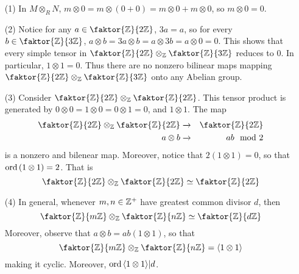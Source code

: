 \begin{example}\label{example_4.11}
    \begin{enumerate}
        \item[(1)] In $M \otimes_R N$, $m \otimes 0=m \otimes (0+0)=m \otimes
            0+m \otimes 0$, so $m \otimes 0=0$.

        \item[(2)] Notice for any $a \in \faktor{\Z}{2\Z}$, $3a=a$, so for every
            $b \in \faktor{\Z}{3\Z}$, $a \otimes b=3a \otimes b=a \otimes 3b=a
            \otimes 0=0$. This shows that every simple tensor in
            $\faktor{\Z}{2\Z} \otimes_\Z \faktor{\Z}{3\Z}$ reduces to $0$. In
            particular, $1 \otimes 1=0$. Thus there are no nonzero bilinear maps
            mapping $\faktor{\Z}{2\Z} \otimes_\Z \faktor{\Z}{3\Z}$ onto any
            Abelian group.

        \item[(3)] Consider $\faktor{\Z}{2\Z} \otimes_\Z \faktor{\Z}{2\Z}$. This
            tensor product is generated by $0 \otimes 0=1 \otimes 0=0 \otimes
            1=0$, and $1 \otimes 1$. The map
            \begin{eqnarray*}
                \faktor{\Z}{2\Z} \otimes_\Z \faktor{\Z}{2\Z} & \xrightarrow{} &
                                             \faktor{\Z}{2\Z}   \\
                a \otimes b     & \xrightarrow{} & ab \mod{2}   \\
            \end{eqnarray*}
            is a nonzero and bilenear map. Moreover, notice that $2(1 \otimes
            1)=0$, so that $\operatorname{ord}{(1 \otimes 1)}=2$. That is
            \begin{equation*}
                \faktor{\Z}{2\Z} \otimes_\Z \faktor{\Z}{2\Z} \simeq \faktor{\Z}{2\Z}
            \end{equation*}

        \item[(4)] In general, whenever $m,n \in \mathbb{Z}^+$ have greatest common
            divisor $d$, then
            \begin{equation*}
                \faktor{\Z}{m\Z} \otimes_\Z \faktor{\Z}{n\Z} \simeq \faktor{\Z}{d\Z}
            \end{equation*}
            Moreover, observe that $a \otimes b=ab(1 \otimes 1)$, so that
            \begin{equation*}
                \faktor{\Z}{m\Z} \otimes_\Z \faktor{\Z}{n\Z}=\langle 1 \otimes 1 \rangle
            \end{equation*}
            making it cyclic. Moreover, $\operatorname{ord}{\langle 1 \otimes 1\rangle}|d$.


\end{enumerate}
\end{example}

